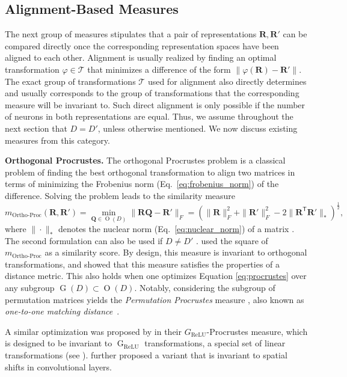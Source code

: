 \documentclass{article}
\newcommand{\citet}{\textcite}
\newcommand{\R}{\bm{R}}
\newcommand{\Rp}{\bm{R'}}
\newcommand{\transp}{\mathsf{T}}
\newcommand\myeqref[1]{%
    (\textup{Eq.~\ref{#1}})%
}
\newcommand{\subheader}{\textbf}
\begin{document}
\subsection{Alignment-Based Measures}
The next group of measures stipulates that a pair of representations $\R,\Rp$ can be compared directly once the corresponding representation spaces have been aligned to each other.
Alignment is usually realized by finding an optimal transformation $\varphi\in\mathcal{T}$ that minimizes a difference of the form $\|\varphi(\R) - \Rp \|$.
The exact group of transformations $\mathcal{T}$ used for alignment also directly determines and usually corresponds to the group of transformations that the corresponding measure will be invariant to.
Such direct alignment is only possible if the number of neurons in both representations are equal.
Thus, we assume throughout the next section that $D = D'$, unless otherwise mentioned.
We now discuss existing measures from this category.


\subheader{Orthogonal Procrustes.}\label{sssec:orthoproc}
The orthogonal Procrustes problem is a classical problem of finding the best orthogonal transformation to align two matrices in terms of minimizing the Frobenius norm \myeqref{eq:frobenius_norm} of the difference.
Solving the problem leads to the similarity measure
\begin{equation}\label{eq:procrustes}
    m_{\operatorname{Ortho-Proc}}(\R,\Rp) = \min_{\bm{Q} \in \operatorname{O}(D)} \|\R \bm{Q} - \Rp\|_F = (\|\R\|_F^2 + \|\Rp\|_F^2 - 2 \| \R^\transp\Rp\|_*)^{\frac{1}{2}} ,
\end{equation}
where $\|\cdot\|_*$ denotes the nuclear norm \myeqref{eq:nuclear_norm} of a matrix \cite{schonemann_generalized_1966}.
The second formulation can also be used if $D\neq D'$ \cite{khosla_soft_2024}.
\citet{ding_grounding_2021} used the square of $m_{\operatorname{Ortho-Proc}}$ as a similarity score.
By design, this measure is invariant to orthogonal transformations, and \citet{williams_generalized_2022} showed that this measure satisfies the properties of a distance metric. This also holds when one optimizes Equation \ref{eq:procrustes} over any subgroup $\operatorname{G}(D)\subset \operatorname{O}(D)$.
Notably, considering the subgroup of permutation matrices yields the \emph{Permutation Procrustes} measure \cite{williams_generalized_2022}, also known as \emph{one-to-one matching distance}~\cite{khosla_soft_2024}.

A similar optimization was proposed by \citet{godfrey_symmetries_2022} in their $G_{\operatorname{ReLU}}$-Procrustes measure, which is designed to be invariant to $\operatorname{G}_{\operatorname{ReLU}}$ transformations, a special set of linear transformations (see ).
\citet{williams_generalized_2022} further proposed a variant that is invariant to spatial shifts in convolutional layers.
\end{document}
